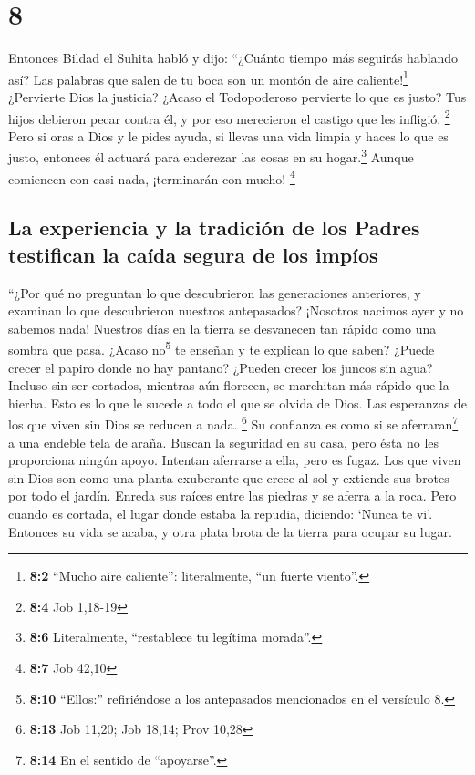 \hypertarget{section-7}{%
\section{8}\label{section-7}}

 Entonces Bildad el Suhita habló y dijo: 
``¿Cuánto tiempo más seguirás hablando así? Las palabras que salen de tu
boca son un montón de aire caliente!\footnote{\textbf{8:2} ``Mucho aire
  caliente'': literalmente, ``un fuerte viento''.} 
¿Pervierte Dios la justicia? ¿Acaso el Todopoderoso pervierte lo que es
justo?  Tus hijos debieron pecar contra él, y por eso
merecieron el castigo que les infligió. \footnote{\textbf{8:4} Job
  1,18-19}  Pero si oras a Dios y le pides ayuda,
 si llevas una vida limpia y haces lo que es justo,
entonces él actuará para enderezar las cosas en su hogar.\footnote{\textbf{8:6}
  Literalmente, ``restablece tu legítima morada''.} 
Aunque comiencen con casi nada, ¡terminarán con mucho! \footnote{\textbf{8:7}
  Job 42,10}

\hypertarget{la-experiencia-y-la-tradiciuxf3n-de-los-padres-testifican-la-cauxedda-segura-de-los-impuxedos}{%
\subsection{La experiencia y la tradición de los Padres testifican la
caída segura de los
impíos}\label{la-experiencia-y-la-tradiciuxf3n-de-los-padres-testifican-la-cauxedda-segura-de-los-impuxedos}}

 ``¿Por qué no preguntan lo que descubrieron las
generaciones anteriores, y examinan lo que descubrieron nuestros
antepasados? ¡Nosotros nacimos ayer y no sabemos nada! 
Nuestros días en la tierra se desvanecen tan rápido como una sombra que
pasa.  ¿Acaso no\footnote{\textbf{8:10} ``Ellos:''
  refiriéndose a los antepasados mencionados en el versículo 8.} te
enseñan y te explican lo que saben?  ¿Puede crecer el
papiro donde no hay pantano? ¿Pueden crecer los juncos sin agua?
 Incluso sin ser cortados, mientras aún florecen, se
marchitan más rápido que la hierba.  Esto es lo que le
sucede a todo el que se olvida de Dios. Las esperanzas de los que viven
sin Dios se reducen a nada. \footnote{\textbf{8:13} Job 11,20; Job
  18,14; Prov 10,28}  Su confianza es como si se
aferraran\footnote{\textbf{8:14} En el sentido de ``apoyarse''.} a una
endeble tela de araña.  Buscan la seguridad en su casa,
pero ésta no les proporciona ningún apoyo. Intentan aferrarse a ella,
pero es fugaz.  Los que viven sin Dios son como una
planta exuberante que crece al sol y extiende sus brotes por todo el
jardín.  Enreda sus raíces entre las piedras y se aferra
a la roca.  Pero cuando es cortada, el lugar donde estaba
la repudia, diciendo: `Nunca te vi'.  Entonces su vida se
acaba, y otra plata brota de la tierra para ocupar su lugar.

